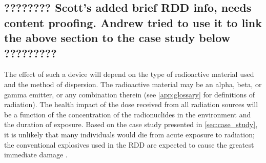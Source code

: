 \documentclass{report}
\begin{document}
\subsection{???????? Scott's added brief RDD info, needs content proofing. Andrew tried to use it to link the above section to the case study below    ?????????}

The effect of such a device will depend on the type of radioactive material used and the method of dispersion. The radioactive material may be an alpha, beta, or gamma emitter, or any combination therein (see \autoref{app:glossary} for definitions of radiation). The health impact of the dose received from all radiation sources will be a function of the concentration of the radionuclides in the environment and the duration of exposure. Based on the case study presented in \autoref{sec:case_study}, it is unlikely that many individuals would die from acute exposure to radiation; the conventional explosives used in the RDD are expected to cause the greatest immediate damage \cite{USDepartmentofHealthandHumanServices:RadiationEmergencyMedicalManagement2014}.

 
\end{document}

